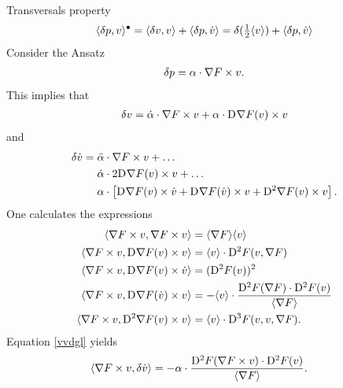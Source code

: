 Transversals property
\begin{align}
    \langle  \delta p ,  v  \rangle^\bullet  =
    \langle  \delta v ,  v  \rangle  +  \langle  \delta p ,  \dot{ v }  \rangle  =
    \delta( \tfrac12 \langle  v  \rangle )  +  \langle  \delta p ,  \dot{ v }  \rangle
\end{align}
Consider the Ansatz
\begin{align}
    \delta p  =  \alpha \cdot \nabla F  \times v .
\end{align}
This implies that
\begin{align}
    \delta v  =
    \dot{ \alpha } \cdot \nabla F  \times v  +
    \alpha \cdot \mathrm{D}^{  } \nabla F  ( v ) \times v
\end{align}
and
\begin{align}
    \delta \dot{ v }  &=
    \ddot{ \alpha } \mult \grad{ F } \times v  +  \dots\nonumber\\
    &\hphantom{{}={}}\dot{ \alpha } \mult 2 \diff{}{ \grad{ F } }( v ) \times v  +  \dots\nonumber\\
    &\hphantom{{}={}}\alpha \mult \left[ \diff{}{ \grad{ F } }( v ) \times \dot{ v }  +
    \diff{}{ \grad{ F } }( \dot{ v } ) \times v  +  
    \diff{ 2 }{ \grad{ F } }( v ) \times v \right] .
\end{align}
One calculates the expressions
\begin{subequations}
    \begin{align}
        \langle  \nabla F  \times v ,  \nabla F  \times v  \rangle  &=
        \langle  \nabla F   \rangle \langle  v  \rangle\\
        \langle  \nabla F  \times v ,  \mathrm{D}^{  } \nabla F  ( v ) \times v  \rangle  &=
        \langle  v  \rangle \cdot \mathrm{D}^{ 2 } F ( v, \nabla F  )\\
        \langle  \nabla F  \times v ,  \mathrm{D}^{  } \nabla F  ( v ) \times \dot{ v }  \rangle  &=
        ( \mathrm{D}^{ 2 } F ( v ) )^2\\
        \langle  \nabla F  \times v ,  \mathrm{D}^{  } \nabla F  ( \dot{ v } ) \times v  \rangle  &=
        -  \langle  v  \rangle \cdot \frac{ \mathrm{D}^{ 2 } F ( \nabla F  ) \cdot \mathrm{D}^{ 2 } F ( v ) }{ \langle  \nabla F   \rangle }\\
        \langle  \nabla F  \times v ,  \mathrm{D}^{ 2 } \nabla F  ( v ) \times v  \rangle  &=
        \langle  v  \rangle \cdot \mathrm{D}^{ 3 } F ( v, v, \nabla F  ) .
    \end{align}
\end{subequations}
Equation \eqref{vvdgl} yields
\begin{align}
    \langle  \nabla F  \times v ,  \delta \dot{ v }  \rangle  &=
    -\alpha \cdot \frac{ \mathrm{D}^{ 2 } F ( \nabla F  \times v ) \cdot \mathrm{D}^{ 2 } F ( v ) }{ \langle  \nabla F   \rangle } .
\end{align}
